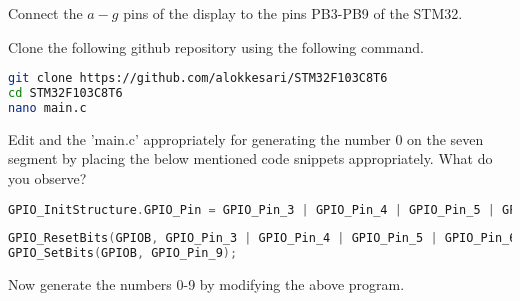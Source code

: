 \begin{problem}
Connect the $a-g$ pins of the display to the pins PB3-PB9 of the STM32.
\end{problem}	
%
\begin{problem}
Clone the following github repository using the following command.  
\begin{lstlisting}[language=bash, frame=single, breaklines]
git clone https://github.com/alokkesari/STM32F103C8T6
cd STM32F103C8T6
nano main.c
\end{lstlisting}
\end{problem}
\begin{problem}
\label{prob:first_code}
Edit and the 'main.c' appropriately for generating the number 0 on the seven segment by placing the below mentioned code snippets appropriately. What do you observe?
\begin{lstlisting}[language=C, frame=single, breaklines]
GPIO_InitStructure.GPIO_Pin = GPIO_Pin_3 | GPIO_Pin_4 | GPIO_Pin_5 | GPIO_Pin_6 | GPIO_Pin_7 | GPIO_Pin_8 | GPIO_Pin_9;
\end{lstlisting}
\begin{lstlisting}[language=C, frame=single, breaklines]
GPIO_ResetBits(GPIOB, GPIO_Pin_3 | GPIO_Pin_4 | GPIO_Pin_5 | GPIO_Pin_6 | GPIO_Pin_7 | GPIO_Pin_8);
GPIO_SetBits(GPIOB, GPIO_Pin_9);
\end{lstlisting}
\end{problem}
\begin{problem}
Now generate the numbers 0-9 by modifying the above program.
\end{problem}
%

